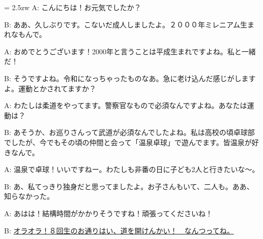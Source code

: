 \documentclass[11pt]{amsart}
\title{}
\author{}
\newenvironment{hangall}[1]{\hangindent = 2.5zw\everypar{\hangindent = 2.5zw}}{}
\begin{document}
\maketitle
\begin{hangall}{}%
A: こんにちは！お元気でしたか？

B: ああ、久しぶりです。こないだ成人しましたよ。２０００年ミレニアム生まれなもんで。

A: おめでとうございます！2000年と言うことは平成生まれですよね。私と一緒だ！

B: そうですよね。令和になっちゃったものなあ。急に老け込んだ感じがしますよ。運動とかされてますか？

A: わたしは柔道をやってます。警察官なもので必須なんですよね。あなたは運動は？

B: あそうか、お巡りさんって武道が必須なんでしたよね。私は高校の頃卓球部でしたが、今でもその頃の仲間と会って「温泉卓球」で遊んでます。皆温泉が好きなんで。

A: 温泉で卓球！いいですねー。わたしも非番の日に子ども2人と行きたいな〜。

B: あ、私てっきり独身だと思ってましたよ。お子さんもいて、二人も。ああ、知らなかった。

A: あはは！結構時間がかかりそうですね！頑張ってくださいね！

B: \ul{オラオラ！８回生のお通りはい、道を開けんかい！　なんつってね。}\end{hangall}
\end{document}
